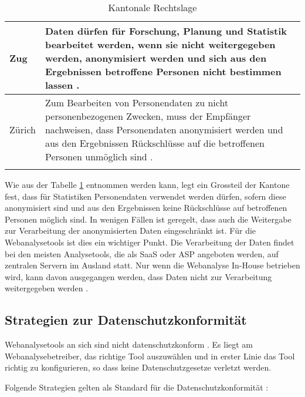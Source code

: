 \begin{longtable}{| p{} | p{}|}
		\hline
    Zug & Daten dürfen für Forschung, Planung und Statistik bearbeitet werden, wenn sie nicht weitergegeben werden, anonymisiert werden und sich aus den Ergebnissen betroffene Personen nicht bestimmen lassen \parencite[§§ 4 Abs 1e]{DSSGZG}. \\
		\hline
    Zürich & Zum Bearbeiten von Personendaten zu nicht personenbezogenen Zwecken, muss der Empfänger nachweisen, dass Personendaten anonymisiert werden und aus den Ergebnissen Rückschlüsse auf die betroffenen Personen unmöglich sind \parencite[§§ 18 Abs. 1-2]{DSSGZH}. \\
		\hline

    \caption{Kantonale Rechtslage}
    \label{tab: ktrechtslage}
	\end{longtable}

  Wie aus der Tabelle \ref{tab: ktrechtslage} entnommen werden kann,
  legt ein Grossteil der Kantone fest, dass für Statistiken Personendaten verwendet werden dürfen, sofern diese anonymisiert sind und aus den Ergebnissen keine Rückschlüsse auf betroffenen Personen möglich sind. In wenigen Fällen ist geregelt, dass auch die Weitergabe zur Verarbeitung der anonymisierten Daten eingeschränkt ist. Für die Webanalysetools ist dies ein wichtiger Punkt. Die Verarbeitung der Daten findet bei den meisten Analysetools, die als SaaS oder ASP angeboten werden, auf zentralen Servern im Ausland statt. Nur wenn die Webanalyse In-House betrieben wird, kann davon ausgegangen werden, dass Daten nicht zur Verarbeitung weitergegeben werden \parencite[S. 174-176]{nakatani2011toolselectionmethod}.


\subsection{Strategien zur Datenschutzkonformität}
Webanalysetools an sich sind nicht datenschutzkonform \parencite[S. 1-4]{EcommerceUndDatenschutz}. Es liegt am Webanalysebetreiber, das richtige Tool auszuwählen und in erster Linie das Tool richtig zu konfigurieren, so dass keine Datenschutzgesetze verletzt werden.

Folgende Strategien gelten als Standard für die Datenschutzkonformität \parencite[S. 2-5]{EcommerceUndDatenschutz}:

